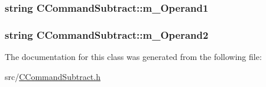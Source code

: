 \subsubsection[{\texorpdfstring{m\+\_\+\+Operand1}{m_Operand1}}]{\setlength{\rightskip}{0pt plus 5cm}string C\+Command\+Subtract\+::m\+\_\+\+Operand1\hspace{0.3cm}{\ttfamily [private]}}\hypertarget{classCCommandSubtract_ac0de4d1a69b9467aa080b8b46635d458}{}\label{classCCommandSubtract_ac0de4d1a69b9467aa080b8b46635d458}
\subsubsection[{\texorpdfstring{m\+\_\+\+Operand2}{m_Operand2}}]{\setlength{\rightskip}{0pt plus 5cm}string C\+Command\+Subtract\+::m\+\_\+\+Operand2\hspace{0.3cm}{\ttfamily [private]}}\hypertarget{classCCommandSubtract_a2da0355a6682b78cb62992fbb6fba499}{}\label{classCCommandSubtract_a2da0355a6682b78cb62992fbb6fba499}


The documentation for this class was generated from the following file\+:\begin{DoxyCompactItemize}
\item 
src/\hyperlink{CCommandSubtract_8h}{C\+Command\+Subtract.\+h}\end{DoxyCompactItemize}
